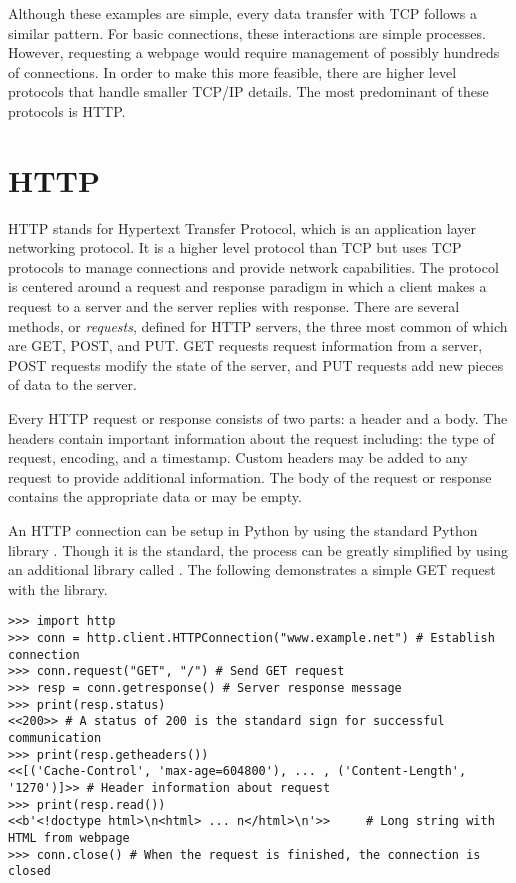 Although these examples are simple, every data transfer with TCP follows a similar pattern.
For basic connections, these interactions are simple processes.
However, requesting a webpage would require management of possibly hundreds of connections.
In order to make this more feasible, there are higher level protocols that handle smaller TCP/IP details.
The most predominant of these protocols is HTTP.

\section*{HTTP} %

HTTP stands for Hypertext Transfer Protocol, which is an application layer networking protocol.
It is a higher level protocol than TCP but uses TCP protocols to manage connections and provide network capabilities.
The protocol is centered around a request and response paradigm in which a client makes a request to a server and the server replies with response.
There are several methods, or \emph{requests}, defined for HTTP servers, the three most common of which are GET, POST, and PUT.
GET requests request information from a server, POST requests modify the state of the server, and PUT requests add new pieces of data to the server.

Every HTTP request or response consists of two parts: a header and a body.
The headers contain important information about the request including: the type of request, encoding, and a timestamp.
Custom headers may be added to any request to provide additional information.
The body of the request or response contains the appropriate data or may be empty.

An HTTP connection can be setup in Python by using the standard Python library .
Though it is the standard, the process can be greatly simplified by using an additional library called .
The following demonstrates a simple GET request with the  library.

\begin{lstlisting}
>>> import http
>>> conn = http.client.HTTPConnection("www.example.net") # Establish connection
>>> conn.request("GET", "/") # Send GET request
>>> resp = conn.getresponse() # Server response message
>>> print(resp.status)
<<200>> # A status of 200 is the standard sign for successful communication
>>> print(resp.getheaders())
<<[('Cache-Control', 'max-age=604800'), ... , ('Content-Length', '1270')]>> # Header information about request
>>> print(resp.read())
<<b'<!doctype html>\n<html> ... n</html>\n'>>     # Long string with HTML from webpage
>>> conn.close() # When the request is finished, the connection is closed
\end{lstlisting}

